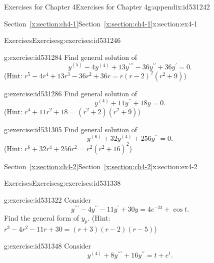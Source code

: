 \documentclass[oneside,10pt,]{book}
\newcommand{\xreffont}{\relax}
\numberwithin{equation}{section}
\numberwithin{equation}{section}
\begin{document}
\begin{appendixptx}{Exercises for Chapter 4}{}{Exercises for Chapter 4}{}{}{g:appendix:id531242}
\begin{sectionptx}{Section~{\xreffont\ref*{x:section:ch4-1}}}{}{Section~{\xreffont\ref*{x:section:ch4-1}}}{}{}{x:section:ex4-1}
\begin{exercises-subsection-numberless}{Exercises}{}{Exercises}{}{}{g:exercises:id531246}
\begin{divisionexercise}{4}{}{}{g:exercise:id531284}
Find general solution of%
\begin{equation*}
y^{(5)}-4y^{(4)}+13y^{\prime\prime\prime}-36y^{\prime\prime}+36y^{\prime}=0.
\end{equation*}
(Hint: \(r^{5}-4r^{4}+13r^{3}-36r^{2}+36r=r\left(r-2\right)^{2}\left(r^{2}+9\right)\))%
\end{divisionexercise}%
\begin{divisionexercise}{5}{}{}{g:exercise:id531286}%
Find general solution of%
\begin{equation*}
y^{(4)}+11y^{\prime\prime}+18y=0.
\end{equation*}
(Hint: \(r^{4}+11r^{2}+18=\left(r^{2}+2\right)\left(r^{2}+9\right)\))%
\end{divisionexercise}%
\begin{divisionexercise}{6}{}{}{g:exercise:id531305}%
Find general solution of%
\begin{equation*}
y^{(6)}+32y^{(4)}+256y^{\prime\prime}=0.
\end{equation*}
(Hint: \(r^{6}+32r^{4}+256r^{2}=r^{2}\left(r^{2}+16\right)^{2}\))%
\end{divisionexercise}%
\end{exercises-subsection-numberless}
\end{sectionptx}
%
%
\typeout{************************************************}
\typeout{Section E.2 Section~{\xreffont\ref*{x:section:ch4-2}}}
\typeout{************************************************}
%
\begin{sectionptx}{Section~{\xreffont\ref*{x:section:ch4-2}}}{}{Section~{\xreffont\ref*{x:section:ch4-2}}}{}{}{x:section:ex4-2}
%
%
\typeout{************************************************}
\typeout{************************************************}
%
\begin{exercises-subsection-numberless}{Exercises}{}{Exercises}{}{}{g:exercises:id531338}
\begin{divisionexercise}{1}{}{}{g:exercise:id531322}%
Consider%
\begin{equation*}
y^{\prime\prime\prime}-4y^{\prime\prime}-11y^{\prime}+30y=4e^{-3t}+\cos t.
\end{equation*}
Find the general form of \(y_{p}\). (Hint: \(r^{3}-4r^{2}-11r+30=\left(r+3\right)\left(r-2\right)\left(r-5\right)\))%
\end{divisionexercise}%
\begin{divisionexercise}{2}{}{}{g:exercise:id531348}%
Consider%
\begin{equation*}
y^{(4)}+8y^{\prime\prime\prime}+16y^{\prime\prime}=t+e^{t}.

\end{equation*}
\end{divisionexercise}
\end{exercises-subsection-numberless}
\end{sectionptx}
\end{appendixptx}
\end{document}
